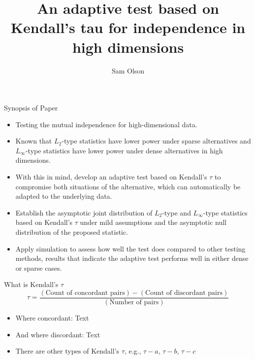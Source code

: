 \documentclass[
  ignorenonframetext,
]{beamer}
\title{An adaptive test based on Kendall's tau for independence in high
dimensions}
\author{Sam Olson}
\date{}
\providecommand{\tightlist}{%
  \setlength{\itemsep}{0pt}\setlength{\parskip}{0pt}}
\begin{document}
\frame{\titlepage}

\begin{frame}{Synopsis of Paper}
\label{synopsis-of-paper}
\begin{itemize}
\tightlist
\item
  Testing the mutual independence for high-dimensional data.
\item
  Known that \(L_2\)-type statistics have lower power under sparse
  alternatives and \(L_\infty\)-type statistics have lower power under
  dense alternatives in high dimensions.
\item
  With this in mind, develop an adaptive test based on Kendall's
  \(\tau\) to compromise both situations of the alternative, which can
  automatically be adapted to the underlying data.
\item
  Establish the asymptotic joint distribution of \(L_2\)-type and
  \(L_\infty\)-type statistics based on Kendall's \(\tau\) under mild
  assumptions and the asymptotic null distribution of the proposed
  statistic.
\item
  Apply simulation to assess how well the test does compared to other
  testing methods, results that indicate the adaptive test performs well
  in either dense or sparse cases.
\end{itemize}
\end{frame}

\begin{frame}{What is Kendall's \(\tau\)}
\label{what-is-kendalls-tau}
\[
\tau = \frac{(\text{Count of concordant pairs}) - (\text{Count of discordant pairs})}{(\text{Number of pairs})}
\]

\begin{itemize}
\tightlist
\item
  Where concordant: Text
\item
  And where discordant: Text
\item
  There are other types of Kendall's \(\tau\), e.g., \(\tau-a\),
  \(\tau-b\), \(\tau-c\)
\end{itemize}
\end{frame}
\end{document}
